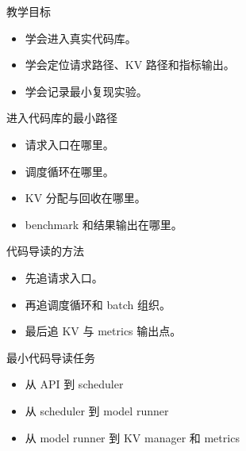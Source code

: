 




\begin{frame}[plain]
  \titlepage
\end{frame}

\begin{frame}{教学目标}
  \begin{itemize}
    \item 学会进入真实代码库。
    \item 学会定位请求路径、KV 路径和指标输出。
    \item 学会记录最小复现实验。
  \end{itemize}
\end{frame}

\begin{frame}{进入代码库的最小路径}
  \begin{itemize}
    \item 请求入口在哪里。
    \item 调度循环在哪里。
    \item KV 分配与回收在哪里。
    \item benchmark 和结果输出在哪里。
  \end{itemize}
\end{frame}

\begin{frame}{代码导读的方法}
  \begin{itemize}
    \item 先追请求入口。
    \item 再追调度循环和 batch 组织。
    \item 最后追 KV 与 metrics 输出点。
  \end{itemize}
\end{frame}

\begin{frame}{最小代码导读任务}
  \begin{itemize}
    \item 从 API 到 scheduler
    \item 从 scheduler 到 model runner
    \item 从 model runner 到 KV manager 和 metrics
  \end{itemize}
\end{frame}

